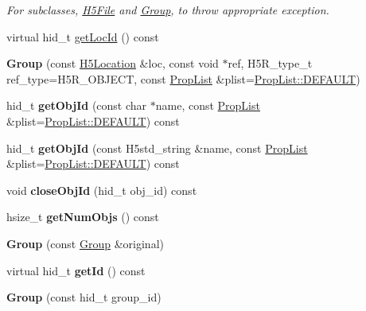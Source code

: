 \begin{DoxyCompactItemize}
\begin{DoxyCompactList}\small\item\em For subclasses, \hyperlink{class_h5_1_1_h5_file}{H5\+File} and \hyperlink{class_h5_1_1_group}{Group}, to throw appropriate exception. \end{DoxyCompactList}\item 
virtual hid\+\_\+t \hyperlink{class_h5_1_1_group_ae8fa39e9d934d254cd1bc2302a7e6391}{get\+Loc\+Id} () const
\item 
\mbox{\label{class_h5_1_1_group_abaaaa49f82fc2f69b46b5d56c461be85}} 
{\bfseries Group} (const \hyperlink{class_h5_1_1_h5_location}{H5\+Location} \&loc, const void $\ast$ref, H5\+R\+\_\+type\+\_\+t ref\+\_\+type=H5\+R\+\_\+\+O\+B\+J\+E\+CT, const \hyperlink{class_h5_1_1_prop_list}{Prop\+List} \&plist=\hyperlink{class_h5_1_1_prop_list_ae52af66ce82af0ea7e6dc57148c56241}{Prop\+List\+::\+D\+E\+F\+A\+U\+LT})
\item 
\mbox{\label{class_h5_1_1_group_aea81a1431e9929994a4c1dfe3814f41e}} 
hid\+\_\+t {\bfseries get\+Obj\+Id} (const char $\ast$name, const \hyperlink{class_h5_1_1_prop_list}{Prop\+List} \&plist=\hyperlink{class_h5_1_1_prop_list_ae52af66ce82af0ea7e6dc57148c56241}{Prop\+List\+::\+D\+E\+F\+A\+U\+LT}) const
\item 
\mbox{\label{class_h5_1_1_group_a520771e913143af3f752b8fbe1bde7df}} 
hid\+\_\+t {\bfseries get\+Obj\+Id} (const H5std\+\_\+string \&name, const \hyperlink{class_h5_1_1_prop_list}{Prop\+List} \&plist=\hyperlink{class_h5_1_1_prop_list_ae52af66ce82af0ea7e6dc57148c56241}{Prop\+List\+::\+D\+E\+F\+A\+U\+LT}) const
\item 
\mbox{\label{class_h5_1_1_group_a99be094b9984b238b28ebfe82a47347c}} 
void {\bfseries close\+Obj\+Id} (hid\+\_\+t obj\+\_\+id) const
\item 
\mbox{\label{class_h5_1_1_group_aaaa2c274c19f4c294a86386a956835c9}} 
hsize\+\_\+t {\bfseries get\+Num\+Objs} () const
\item 
\mbox{\label{class_h5_1_1_group_a17a49de6cbf4e29ef2fcb33d2fecbc4c}} 
{\bfseries Group} (const \hyperlink{class_h5_1_1_group}{Group} \&original)
\item 
\mbox{\label{class_h5_1_1_group_a14cb7779161455e4b31c682fd33d5a13}} 
virtual hid\+\_\+t {\bfseries get\+Id} () const
\item 
\mbox{\label{class_h5_1_1_group_a374615d1dc794c09f7cefc86d7fc7755}} 
{\bfseries Group} (const hid\+\_\+t group\+\_\+id)
\end{DoxyCompactItemize}
